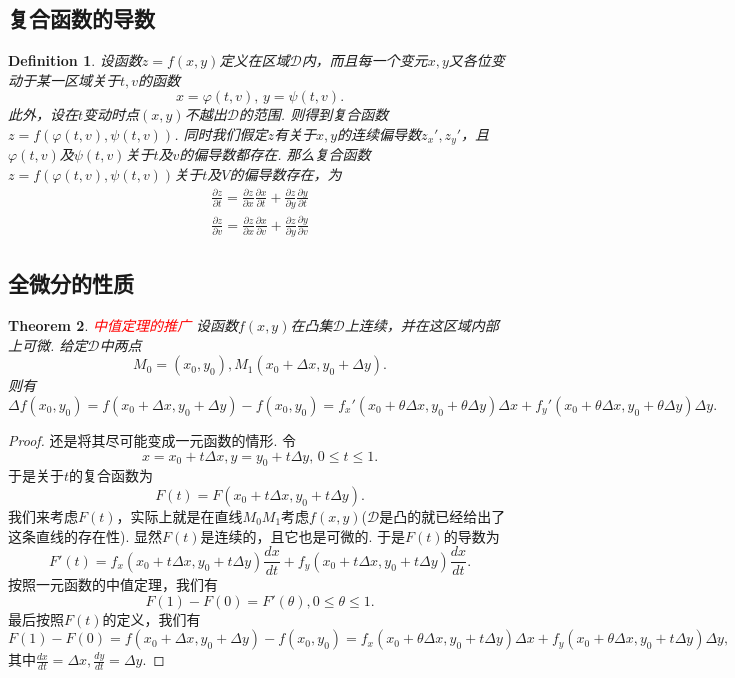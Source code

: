 \documentclass{article}
\newtheorem{theorem}{Theorem}[section]
\newtheorem{definition}[theorem]{Definition}
\newcommand{\redt}[1]{\textcolor{red}{#1}}
\begin{document}
\subsection{复合函数的导数}

\begin{definition}
\rm 设函数$z = f(x,y)$定义在区域$\mathcal{D}$内，而且每一个变元$x,y$又各位变动于某一区域关于$t,v$的函数
$$
x = \varphi(t,v),\, y = \psi(t,v).
$$
此外，设在$t$变动时点$(x,y)$不越出$\mathcal{D}$的范围. 则得到复合函数$z=f(\varphi(t,v),\psi(t,v))$. 同时我们假定$z$有关于$x,y$的连续偏导数$z_x',z_y'$，且$\varphi(t,v)$及$\psi(t,v)$关于$t$及$v$的偏导数都存在. 那么复合函数$z=f(\varphi(t,v),\psi(t,v))$关于$t$及$V$的偏导数存在，为
$$
\begin{array}{ll}
\frac{\partial z}{\partial t} = \frac{\partial z}{\partial x}\frac{\partial x}{\partial t} + \frac{\partial z}{\partial y}\frac{\partial y}{\partial t} \\
\frac{\partial z}{\partial v} = \frac{\partial z}{\partial x}\frac{\partial x}{\partial v} + \frac{\partial z}{\partial y}\frac{\partial y}{\partial v}
\end{array}
$$
\end{definition}

\subsection{全微分的性质}

\begin{theorem}
\rm \redt{中值定理的推广} 设函数$f(x,y)$在凸集$\mathcal{D}$上连续，并在这区域内部上可微. 给定$\mathcal{D}$中两点
$$
M_0 = (x_0,y_0), M_1(x_0+\Delta x,y_0 + \Delta y).
$$
则有
$$
\Delta f(x_0,y_0) = f(x_0+\Delta x, y_0 + \Delta y) - f(x_0,y_0) = f_x'(x_0+\theta\Delta x, y_0 + \theta\Delta y)\Delta x + f_y'(x_0+\theta\Delta x, y_0 + \theta\Delta y)\Delta y.
$$
\end{theorem}

\begin{proof}
还是将其尽可能变成一元函数的情形. 令
$$
x = x_0 + t\Delta x, y = y_0 + t\Delta y ,\, 0 \leq t \leq 1 .
$$
于是关于$t$的复合函数为
$$
F(t) = F(x_0 + t\Delta x,y_0 + t\Delta y).
$$
我们来考虑$F(t)$，实际上就是在直线$M_0M_1$考虑$f(x,y)$($\mathcal{D}$是凸的就已经给出了这条直线的存在性). 显然$F(t)$是连续的，且它也是可微的. 于是$F(t)$的导数为
$$
F'(t) = f_x(x_0 + t\Delta x,y_0 + t\Delta y)\frac{dx}{dt} + f_y(x_0 + t\Delta x,y_0 + t\Delta y)\frac{dx}{dt}. 
$$
按照一元函数的中值定理，我们有
$$
F(1)-F(0) = F'(\theta), 0 \leq \theta \leq 1.
$$
最后按照$F(t)$的定义，我们有
$$
F(1)-F(0) = f(x_0+\Delta x, y_0 + \Delta y) - f(x_0,y_0) = f_x(x_0 + \theta\Delta x,y_0 + t\Delta y)\Delta x + f_y(x_0 + \theta\Delta x,y_0 + t\Delta y)\Delta y,
$$
其中$\frac{dx}{dt} = \Delta x, \frac{dy}{dt} = \Delta y$. 
\end{proof}
\end{document}
